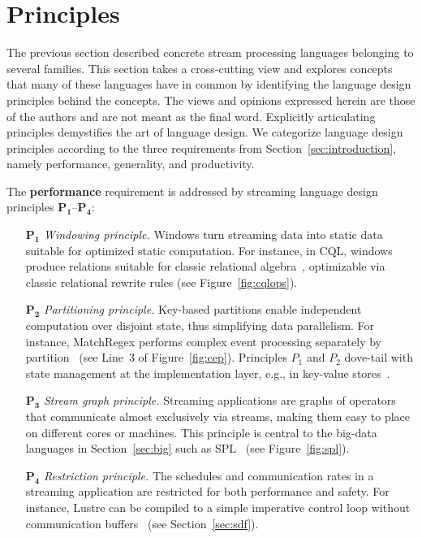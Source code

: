 \section{Principles}\label{sec:principles}

The previous section described concrete stream processing languages
belonging to several families. This section takes a cross-cutting view
and explores concepts that many of these languages have in common by
identifying the language design principles behind the concepts.
The views and opinions expressed herein are those of the authors and
are not meant as the final word.  Explicitly articulating principles
demystifies the art of language design. We categorize language design
principles according to the three requirements from
Section~\ref{sec:introduction}, namely performance, generality, and
productivity.

The \textbf{performance} requirement is addressed by streaming
language design principles $\mathbf{P_1}$--$\mathbf{P_4}$:
\begin{itemize}[leftmargin=6mm]
  \item[$\mathbf{P_1}$] \emph{Windowing principle.} Windows turn streaming
    data into static data suitable for optimized static computation.
    For instance, in CQL, windows produce relations suitable for
    classic relational algebra~\cite{arasu_babu_widom_2006},
    optimizable via classic relational rewrite rules (see
    Figure~\ref{fig:cqlops}).
  \item[$\mathbf{P_2}$] \emph{Partitioning principle.} Key-based partitions
    enable independent computation over disjoint state, thus
    simplifying data parallelism. %
    For instance, MatchRegex performs complex event processing separately by
    partition~\cite{hirzel_2012} (see Line~3 of Figure~\ref{fig:cep}).
    Principles $P_1$ and $P_2$ dove-tail with state management at the
    implementation layer, e.g., in key-value stores~\cite{gedik_et_al_2014}.
  \item[$\mathbf{P_3}$] \emph{Stream graph principle.} Streaming
    applications are graphs of operators that communicate almost
    exclusively via streams, making them easy to place on different
    cores or machines. This principle is central to the big-data
    languages in Section~\ref{sec:big} such as
    SPL~\cite{hirzel_schneider_gedik_2017} (see Figure~\ref{fig:spl}).
  \item[$\mathbf{P_4}$] \emph{Restriction principle.} The schedules and
    communication rates in a streaming application are restricted for
    both performance and safety. For instance, Lustre can be compiled
    to a simple imperative control loop without communication
    buffers~\cite{lustre_1987} (see Section~\ref{sec:sdf}).
\end{itemize}

